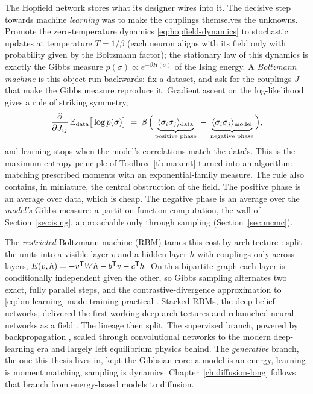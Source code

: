 The Hopfield network stores what its designer wires into it. The decisive
step towards machine \emph{learning} was to make the couplings themselves
the unknowns. Promote the zero-temperature dynamics
\eqref{eq:hopfield-dynamics} to stochastic updates at temperature
$T = 1/\beta$ (each neuron aligns with its field only with probability
given by the Boltzmann factor); the stationary law of this dynamics is
exactly the Gibbs measure $p(\sigma) \propto e^{-\beta H(\sigma)}$ of the
Ising energy. A \emph{Boltzmann machine} \citep{ackley1985learning} is
this object run backwards: fix a dataset, and ask for the couplings $J$
that make the Gibbs measure reproduce it. Gradient ascent on the
log-likelihood gives a rule of striking symmetry,
\begin{equation}
  \frac{\partial}{\partial J_{ij}} \,\mathbb{E}_{\text{data}}\big[\log p(\sigma)\big]
  \;=\; \beta\,\Big(
  \underbrace{\langle \sigma_i \sigma_j \rangle_{\text{data}}}_{\text{positive phase}}
  \;-\;
  \underbrace{\langle \sigma_i \sigma_j \rangle_{\text{model}}}_{\text{negative phase}}
  \Big),
  \label{eq:bm-learning}
\end{equation}
and learning stops when the model's correlations match the data's. This
is the maximum-entropy principle of Toolbox~\ref{tb:maxent} turned into
an algorithm: matching prescribed moments with an exponential-family
measure. The rule also contains, in miniature, the central obstruction of
the field. The positive phase is an average over data, which is cheap.
The negative phase is an average over the \emph{model's} Gibbs measure: a
partition-function computation, the wall of Section~\ref{sec:ising},
approachable only through sampling
(Section~\ref{sec:mcmc}).

The \emph{restricted} Boltzmann machine (RBM) tames this cost by
architecture \citep{smolensky1986information}: split the units into a
visible layer $v$ and a hidden layer $h$ with couplings only across
layers, $E(v,h) = -v^{\mathsf{T}} W h - b^{\mathsf{T}} v - c^{\mathsf{T}} h$. On this bipartite graph
each layer is conditionally independent given the other, so Gibbs
sampling alternates two exact, fully parallel steps, and the
contrastive-divergence approximation to \eqref{eq:bm-learning} made
training practical \citep{hinton2002training}. Stacked RBMs, the deep
belief networks, delivered the first working deep architectures and
relaunched neural networks as a field \citep{hinton2006fast}. The lineage
then split. The supervised branch, powered by backpropagation
\citep{rumelhart1986learning}, scaled through convolutional networks to
the modern deep-learning era \citep{krizhevsky2012imagenet,
lecun2015deep} and largely left equilibrium physics behind. The
\emph{generative} branch, the one this thesis lives in, kept the Gibbsian
core: a model is an energy, learning is moment matching, sampling is
dynamics. Chapter~\ref{ch:diffusion-long} follows that branch from
energy-based models to diffusion.

